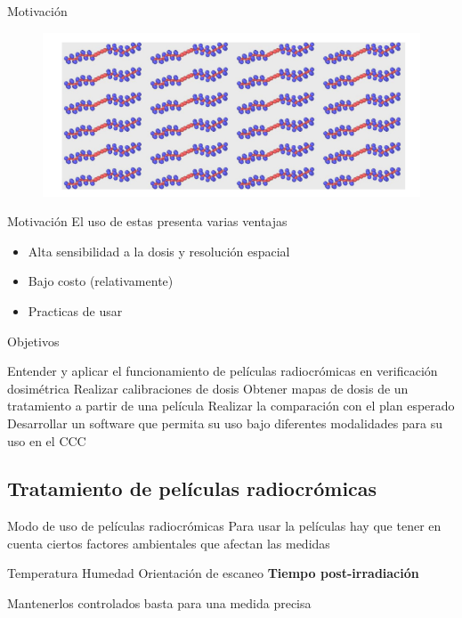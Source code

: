 \documentclass[12pt]{beamer}
\begin{document}
\begin{frame}{Motivación}
\begin{figure}
	\centering
	\includegraphics[width=\linewidth]{images/diacetileno.png}
\end{figure}
\end{frame}

\begin{frame}{Motivación}
	El uso de estas presenta varias ventajas
	\begin{itemize}
		\item Alta sensibilidad a la dosis y resolución espacial
		\item Bajo costo (relativamente)
		\item Practicas de usar
	\end{itemize}
\end{frame}

\begin{frame}{Objetivos}
	\begin{outline}
		\1 Entender y aplicar el funcionamiento de películas radiocrómicas en verificación dosimétrica
		\2 Realizar calibraciones de dosis
		\2 Obtener mapas de dosis de un tratamiento a partir de una película
		\2 Realizar la comparación con el plan esperado
		\1 Desarrollar un software que permita su uso bajo diferentes modalidades para su uso en el CCC
	\end{outline}
\end{frame}


\subsection{Tratamiento de películas radiocrómicas}
\begin{frame}{Modo de uso de películas radiocrómicas}
Para usar la películas hay que tener en cuenta ciertos factores ambientales que afectan las medidas
	\begin{outline}
		\1 Temperatura
		\1 Humedad
		\1 Orientación de escaneo
		\1 \textbf{Tiempo post-irradiación}
	\end{outline}
Mantenerlos controlados basta para una medida precisa
\end{frame}
\end{document}
